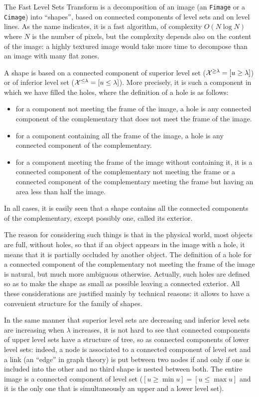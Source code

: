 The Fast Level Sets Transform is a decomposition of an image
(an \texttt{Fimage} or a \texttt{Cimage}) into ``shapes'', based on connected
components of level sets and on level lines. As the name
indicates, it is a fast algorithm, of complexity $O(N\log N)$
where $N$ is the number of pixels, but the complexity depends
also on the content of the image: a highly textured image would
take more time to decompose than an image with many flat zones.

A shape is based on a connected component of superior level set
(${\cal X}^{\geq \lambda} = [u\geq \lambda]$) or of inferior
level set (${\cal X}^{\leq \lambda} = [u \leq \lambda]$). More
precisely, it is such a component in which we have filled the
holes, where the definition of a hole is as follows:
\begin{itemize}
\item for a component not meeting the frame of the image, a hole
is any connected component of the complementary that does not meet
the frame of the image.
\item for a component containing all the frame of the image, a
hole is any connected component of the complementary.
\item for a component meeting the frame of the image without
containing it, it is a connected component of the
complementary not meeting the frame or a connected component of
the complementary meeting the frame but having an area less than
half the image.
\end{itemize}
In all cases, it is easily seen that a shape contains all the
connected components of the complementary, except possibly one,
called its exterior.

The reason for considering such things is that in the physical world,
most objects are full, without holes, so that if an object appears in
the image with a hole, it means that it is partially occluded by another
object. The definition of a hole for a connected component of the
complementary not meeting the frame of the image is natural, but much
more ambiguous otherwise. Actually, such holes are defined so as to make
the shape as small as possible leaving a connected exterior. All these
considerations are justified mainly by technical reasons: it allows to have
a convenient structure for the family of shapes.

In the same manner that superior level sets are decreasing and inferior level
sets are increasing when $\lambda$ increases, it is not hard to see that
connected components of upper level sets have a structure of tree, so as
connected components of lower level sets: indeed, a node is associated to
a connected component of level set and a link (an ``edge'' in graph theory)
is put between two nodes if and only if one is included into the other and
no third shape is nested between both. The entire image is a connected
component of level set ($[u\geq \min u] = [u \leq \max u]$ and it is the only
one that is simultaneously an upper and a lower level set).

